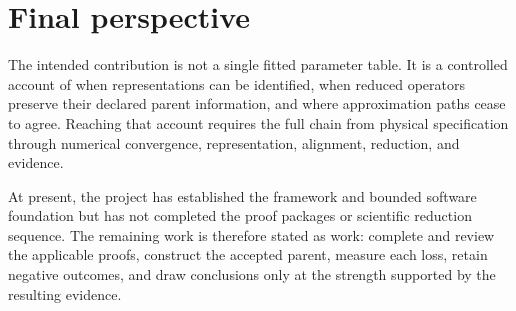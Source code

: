 \section{Final perspective}

The intended contribution is not a single fitted parameter table. It is a
controlled account of when representations can be identified, when reduced
operators preserve their declared parent information, and where approximation
paths cease to agree. Reaching that account requires the full chain from
physical specification through numerical convergence, representation,
alignment, reduction, and evidence.

At present, the project has established the framework and bounded software
foundation but has not completed the proof packages or scientific reduction
sequence. The remaining work is therefore stated as work: complete and review
the applicable proofs, construct the accepted parent, measure each loss, retain
negative outcomes, and draw conclusions only at the strength supported by the
resulting evidence.
